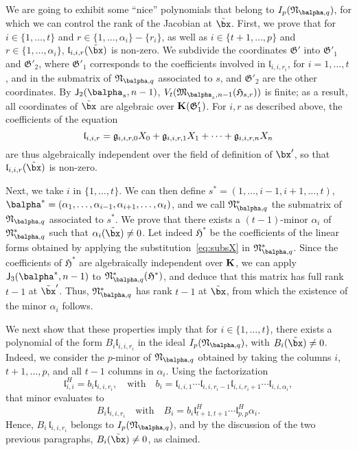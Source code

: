 \documentclass[12pt]{article}
\begin{document}
We are going to exhibit some ``nice'' polynomials that belong to
$I_p(\mathfrak{N}_{\balpha,q})$, for which we can control the rank of the
Jacobian at $\tilde\bx$. First, we prove that for $i\in\{1,\dots,t\}$
and $r \in \{1,\dots,\alpha_i\}-\{r_i\}$, as well as $i\in\{t+1,\dots,p\}$
and $r \in \{1,\dots,\alpha_i\}$, $\mathfrak{l}_{i,i,r}(\tilde\bx)$ is
non-zero.  We subdivide the coordinates $\mathfrak{G}'$ into
$\mathfrak{G}'_1$ and $\mathfrak{G}'_2$, where $\mathfrak{G}'_1$
corresponds to the coefficients involved in $\mathfrak{l}_{i,i,r_i}$,
for $i=1,\dots,t$, and in the submatrix of $\mathfrak{N}_{\balpha,q}$
associated to $s$, and $\mathfrak{G}'_2$ are the other coordinates.
By $\assI_2(\balpha_s,n-1)$,  $V_t(\mathfrak{M}_{\balpha_s,n-1}(\mathfrak{H}_{s,r}))$ 
is finite; as a result, all coordinates of $\tilde\bx$ are algebraic
over $\mathbf{K}(\mathfrak{G}'_1)$. For $i,r$ as described above, the coefficients of the equation
$$\mathfrak{l}_{i,i,r} = \frak{g}_{i,i,r,0} X_0+ \frak{g}_{i,i,r,1}
X_1 +\cdots + \frak{g}_{i,i,r,n} X_n$$ are thus algebraically independent
over the field of definition of $\bx'$, so that $\mathfrak{l}_{i,i,r}(\tilde\bx)$
is non-zero.

Next, we take $i$ in $\{1,\dots,t\}$. We can then define
$s^*=(1,\dots,i-1,i+1,\dots,t)$,
$\balpha^*=(\alpha_1,\dots,\alpha_{i-1},\alpha_{i+1},\dots,\alpha_t)$, and we call
$\mathfrak{N}_{\balpha,q}^*$ the submatrix of
$\mathfrak{N}_{\balpha,q}$ associated to $s^*$. We prove that there exists a $(t-1)$-minor
$\alpha_i$ of $\mathfrak{N}_{\balpha,q}^*$ such that $\alpha_i(\tilde\bx)\ne 0$.  Let indeed
$\mathfrak{H}^*$ be the coefficients of the linear forms obtained by
applying the substitution~\eqref{eq:subsX} in
$\mathfrak{N}_{\balpha,q}^*$. Since the coefficients of $\mathfrak{H}^*$
are algebraically independent over $\mathbf{K}$, we can apply $\assI_3(\balpha^*,n-1)$ to $\mathfrak{N}_{\balpha,q}^*(\mathfrak{H}^*)$,
and deduce that this matrix has full rank $t-1$ at $\tilde\bx'$.
Thus, $\mathfrak{N}_{\balpha,q}^*$ has rank $t-1$ at $\tilde\bx$, 
from which the existence of the minor $\alpha_i$ follows.

We next show that these properties imply that for $i\in\{1,\dots,t\}$,
there exists a polynomial of the form $B_{i} \mathfrak{l}_{i,i,r_i}$
in the ideal $I_p(\mathfrak{N}_{\balpha,q})$, with $B_{i}(\tilde\bx)\ne
0$. Indeed, we consider the $p$-minor of $\mathfrak{N}_{\balpha,q}$
obtained by taking the columns $i$,$t+1,\dots,p$, and all $t-1$ columns
in $\alpha_i$. Using the factorization
$$\mathfrak{l}^H_{i,i} = b_i \mathfrak{l}_{i,i,r_i},\quad\text{with}\quad
b_i=\mathfrak{l}_{i,i,1}\cdots \mathfrak{l}_{i,i,r_i-1}\mathfrak{l}_{i,i,r_i+1}\cdots \mathfrak{l}_{i,i,\alpha_i},$$
that minor evaluates to 
$$B_i \mathfrak{l}_{i,i,r_i}\quad\text{with}\quad B_i = b_i
\mathfrak{l}^H_{t+1,t+1}\cdots \mathfrak{l}^H_{p,p}\alpha_i.$$ Hence, $B_i\,
\mathfrak{l}_{i,i,r_i}$ belongs to $I_p(\mathfrak{N}_{\balpha,q})$, and by
the discussion of the two previous paragraphs, $B_i(\tilde\bx)\ne 0$,
as claimed.
\end{document}
